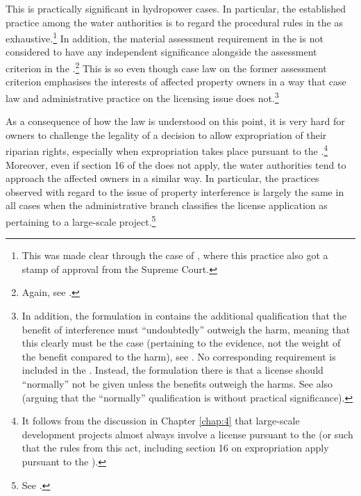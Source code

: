This is practically significant in hydropower cases. In particular, the established practice among the water authorities is to regard the procedural rules in the \cite{wra17} as exhaustive.\footnote{This was made clear through the case of \cite{jorpeland11}, where this practice also got a stamp of approval from the Supreme Court.} In addition, the material assessment requirement in the \cite{ea59} is not considered to have any independent significance alongside the assessment criterion in the \cite{wra17}.\footnote{Again, see \cite{jorpeland11}.} This is so even though case law on the former assessment criterion emphasises the interests of affected property owners in a way that case law and administrative practice on the licensing issue does not.\footnote{In addition, the formulation in \cite[2]{ea59} contains the additional qualification that the benefit of interference must ``undoubtedly'' outweigh the harm, meaning that this clearly must be the case (pertaining to the evidence, not the weight of the benefit compared to the harm), see \cite{lovenskiold09}. No corresponding requirement is included in the \cite[8]{wra17}. Instead, the formulation there is that a license should ``normally'' not be given unless the benefits outweigh the harms. See also \cite[325-236]{haagensen02} (arguing that the ``normally'' qualification is without practical significance).}


As a consequence of how the law is understood on this point, it is very hard for owners to challenge the legality of a decision to allow expropriation of their riparian rights, especially when expropriation takes place pursuant to the \cite{wra17}.\footnote{It follows from the discussion in Chapter \ref{chap:4} that large-scale development projects almost always involve a license pursuant to the \cite{wra17} (or such that the rules from this act, including section 16 on expropriation apply pursuant to the \cite{wra00}).} Moreover, even if section 16 of the \cite{wra17} does not apply, the water authorities tend to approach the affected owners in a similar way. In particular, the practices observed with regard to the issue of property interference is largely the same in all cases when the administrative branch classifies the license application as pertaining to a large-scale project.\footnote{See \cite{flatby08}.}

